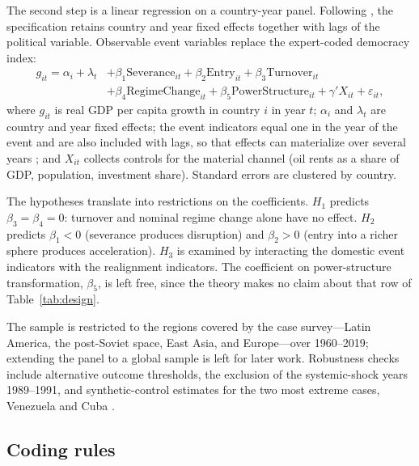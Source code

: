 \documentclass[11pt]{article}
\begin{document}
The second step is a linear regression on a country-year panel. Following \textcite{acemoglu_naidu_restrepo_robinson_2019}, the specification retains country and year fixed effects together with lags of the political variable. Observable event variables replace the expert-coded democracy index:
\begin{equation}
\begin{split}
g_{it} = \alpha_i + \lambda_t &+ \beta_1 \mathrm{Severance}_{it} + \beta_2 \mathrm{Entry}_{it} + \beta_3 \mathrm{Turnover}_{it} \\
&+ \beta_4 \mathrm{RegimeChange}_{it} + \beta_5 \mathrm{PowerStructure}_{it} + \gamma' X_{it} + \varepsilon_{it},
\end{split}
\label{eq:main}
\end{equation}
where $g_{it}$ is real GDP per capita growth in country $i$ in year $t$; $\alpha_i$ and $\lambda_t$ are country and year fixed effects; the event indicators equal one in the year of the event and are also included with lags, so that effects can materialize over several years \parencite{acemoglu_naidu_restrepo_robinson_2019}; and $X_{it}$ collects controls for the material channel (oil rents as a share of GDP, population, investment share). Standard errors are clustered by country.

The hypotheses translate into restrictions on the coefficients. $H_1$ predicts $\beta_3 = \beta_4 = 0$: turnover and nominal regime change alone have no effect. $H_2$ predicts $\beta_1 < 0$ (severance produces disruption) and $\beta_2 > 0$ (entry into a richer sphere produces acceleration). $H_3$ is examined by interacting the domestic event indicators with the realignment indicators. The coefficient on power-structure transformation, $\beta_5$, is left free, since the theory makes no claim about that row of Table~\ref{tab:design}.

The sample is restricted to the regions covered by the case survey---Latin America, the post-Soviet space, East Asia, and Europe---over 1960--2019; extending the panel to a global sample is left for later work. Robustness checks include alternative outcome thresholds, the exclusion of the systemic-shock years 1989--1991, and synthetic-control estimates for the two most extreme cases, Venezuela and Cuba \parencite{abadie_diamond_hainmueller_2010}.

\subsection{Coding rules}
\label{sec:coding}
\end{document}
